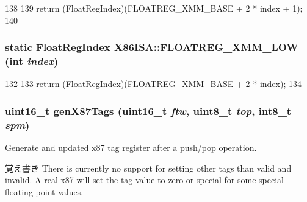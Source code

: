 \begin{DoxyCode}
138     {
139         return (FloatRegIndex)(FLOATREG_XMM_BASE + 2 * index + 1);
140     }
\end{DoxyCode}
\hypertarget{namespaceX86ISA_a7e1716adfb57ca8bf4794517d887ea54}{
\subsubsection[{FLOATREG\_\-XMM\_\-LOW}]{\setlength{\rightskip}{0pt plus 5cm}static {\bf FloatRegIndex} X86ISA::FLOATREG\_\-XMM\_\-LOW (int {\em index})}}
\label{namespaceX86ISA_a7e1716adfb57ca8bf4794517d887ea54}



\begin{DoxyCode}
132     {
133         return (FloatRegIndex)(FLOATREG_XMM_BASE + 2 * index);
134     }
\end{DoxyCode}
\hypertarget{namespaceX86ISA_ac18d679c6eeeda686a1e151dc944a5eb}{
\subsubsection[{genX87Tags}]{\setlength{\rightskip}{0pt plus 5cm}uint16\_\-t genX87Tags (uint16\_\-t {\em ftw}, \/  uint8\_\-t {\em top}, \/  int8\_\-t {\em spm})}}
\label{namespaceX86ISA_ac18d679c6eeeda686a1e151dc944a5eb}
Generate and updated x87 tag register after a push/pop operation.

\begin{DoxyNote}{覚え書き}
There is currently no support for setting other tags than valid and invalid. A real x87 will set the tag value to zero or special for some special floating point values.
\end{DoxyNote}


